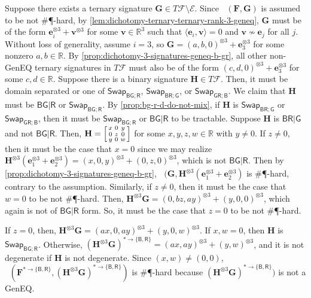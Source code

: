 \documentclass[11pt]{article}
\DeclareMathOperator{\holbs}{Holant^*_2}
\DeclareMathOperator{\holts}{Holant^*_3}
\newcommand{\db}{\mathsf{B}}
\newcommand{\dg}{\mathsf{G}}
\newcommand{\dr}{\mathsf{R}}
\newcommand{\geneq}{\textsf{GenEQ}\xspace}
\newcommand{\swhelper}[1]{$\mathsf{Swap}_{#1}$\xspace}
\newcommand{\swbg}{\swhelper{\db \dg; \dr}}
\newcommand{\swbr}{\swhelper{\db \dr; \dg}}
\newcommand{\swgr}{\swhelper{\dg \dr; \db}}
\newcommand{\sph}{\#\P-hard\xspace}
\newcommand{\teh}{^{\otimes 3}}
\newcommand{\domres}[1]{
  ^{*\to\{#1\}}
}
\begin{document}
Suppose there exists a ternary signature $\mathbf{G} \in T \mathcal{F} \setminus \mathcal{E}$.
Since $\holts(\mathbf{F}, \mathbf{G})$ is assumed to be not \sph, by \cref{lem:dichotomy-ternary-ternary-rank-3-geneq}, $\mathbf{G}$ must be of the form $\mathbf{e}_i\teh + \mathbf{v}\teh$ for some $\mathbf{v} \in \mathbb{R}^3$ such that $\langle \mathbf{e}_i, \mathbf{v} \rangle = 0$ and $\mathbf{v} \not \sim \mathbf{e}_j$ for all $j$.
Without loss of generality, assume $i = 3$, so $\mathbf{G} = (a, b, 0)\teh + \mathbf{e}_3\teh$ for some nonzero $a, b \in \mathbb{R}$.
By \cref{prop:dichotomy-3-signatures-geneq-b-gr}, all other non-\geneq ternary signatures in $T \mathcal{F}$ must also be of the form $(c, d, 0)\teh + \mathbf{e}_3\teh$ for some $c, d \in \mathbb{R}$.
Suppose there is a binary signature $\mathbf{H} \in T \mathcal{F}$.
Then, it must be domain separated or one of \swbg, \swbr, or \swgr.
We claim that $\mathbf{H}$ must be $\db \dg | \dr$ or \swbg.
By \cref{prop:bg-r-d-do-not-mix}, if $\mathbf{H}$ is \swbr or \swgr, then it must be \swbg or $\db \dg | \dr$ to be tractable.
Suppose $\mathbf{H}$ is $\db \dr | \dg$ and not $\db \dg | \dr$.
Then, $\mathbf{H} = \begin{bsmallmatrix}
  x & 0 & y \\
  0 & z & 0 \\
  y & 0 & w
\end{bsmallmatrix}$ for some $x, y, z, w \in \mathbb{R}$ with $y \ne 0$.
If $z \ne 0$, then it must be the case that $x = 0$ since we may realize $\mathbf{H}\teh (\mathbf{e}_1\teh + \mathbf{e}_2\teh) = (x, 0, y)\teh + (0, z, 0)\teh$, which is not $\db \dg | \dr$. 
Then by \cref{prop:dichotomy-3-signatures-geneq-b-gr}, $\holts(\mathbf{G}, \mathbf{H}\teh(\mathbf{e}_1\teh + \mathbf{e}_2\teh)$ is \sph, contrary to the assumption.
Similarly, if $z \ne 0$, then it must be the case that $w = 0$ to be not \sph.
Then, $\mathbf{H}\teh \mathbf{G} = (0, bz, ay)\teh + (y, 0, 0)\teh$, which again is not of $\db \dg | \dr$ form.
So, it must be the case that $z = 0$ to be not \sph.

If $z = 0$, then, $\mathbf{H}\teh \mathbf{G} = (ax, 0, ay)\teh + (y, 0, w)\teh$.
If $x, w = 0$, then $\mathbf{H}$ is \swbg.
Otherwise, $(\mathbf{H}\teh \mathbf{G})\domres{\db, \dr} = (ax, ay)\teh + (y, w)\teh$, 
and it is not degenerate if $\mathbf{H}$ is not degenerate.
Since $(x, w) \ne (0, 0)$, $\holbs(\mathbf{F}\domres{\db, \dr}, (\mathbf{H}\teh \mathbf{G})\domres{\db, \dr})$ is \sph
because $(\mathbf{H}\teh \mathbf{G})\domres{\db, \dr})$ is not a \geneq.
\end{document}
